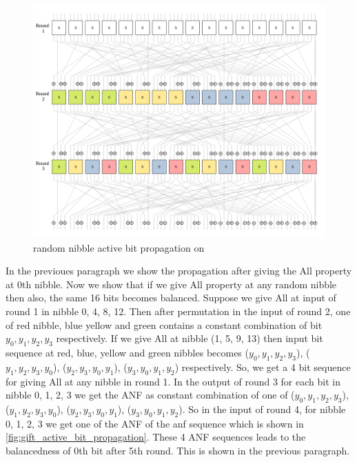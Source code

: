\begin{figure}[!h]
	\centering
	\includegraphics[width=\linewidth]{fig/gift_cipher_active_bit_propagation_random_nibble.pdf}
	\caption{random nibble active bit propagation on \gift}
	\label{fig:gift_active_bit_propagation_random_nibble}
\end{figure}




In the previoues paragraph we show the propagation after giving the All property at 0th nibble. Now we show that if we give All property at any random nibble then also, the same 16 bits becomes balanced. Suppose we give All at input of round 1 in nibble 0, 4, 8, 12. Then after permutation in the input of round 2, one of red nibble, blue yellow and green contains a constant combination of bit $y_0, y_1, y_2, y_3$ respectively. If we give All at nibble (1, 5, 9, 13) then input bit sequence at red, blue, yellow and green nibbles becomes ($y_0, y_1, y_2, y_3$), ($y_1, y_2, y_3, y_0$), ($y_2, y_3, y_0, y_1$), ($y_3, y_0, y_1, y_2$) respectively. So, we get a 4 bit sequence for giving All at any nibble in round 1. In the output of round 3 for each bit in nibble 0, 1, 2, 3 we get the ANF as constant combination of one of ($y_0, y_1, y_2, y_3$), ($y_1, y_2, y_3, y_0$), ($y_2, y_3, y_0, y_1$), ($y_3, y_0, y_1, y_2$). So in the input of round 4, for nibble 0, 1, 2, 3 we get one of the ANF of the anf sequence which is shown in \autoref{fig:gift_active_bit_propagation}. These 4 ANF sequences leads to the balancedness of 0th bit after 5th round. This is shown in the previous paragraph.



